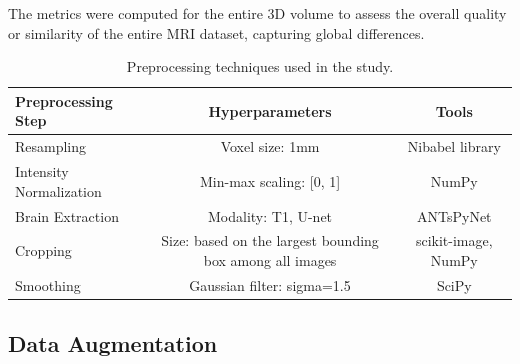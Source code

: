 The metrics were computed for the entire 3D volume to assess the overall quality or similarity of the entire MRI dataset, capturing global differences.
%
\begin{center}
    \begin{table}
        \centering
        \caption{\label{tab:preprocessing_pipeline}Preprocessing techniques used in the study.}
        \begin{tabular*}{500pt}{@{\extracolsep\fill}lcc@{\extracolsep\fill}}
            \toprule
            \textbf{Preprocessing Step} & \textbf{Hyperparameters} & \textbf{Tools} \\
            \midrule
            Resampling & Voxel size: 1mm & Nibabel library \\
            Intensity Normalization & Min-max scaling: [0, 1] & NumPy \\
            Brain Extraction & Modality: T1, U-net & ANTsPyNet \\
            Cropping & Size: based on the largest bounding box among all images & scikit-image, NumPy \\
            Smoothing & Gaussian filter: sigma=1.5 & SciPy \\
            \bottomrule
            \end{tabular*}
    \end{table}
\end{center}
%
\subsection{Data Augmentation}

